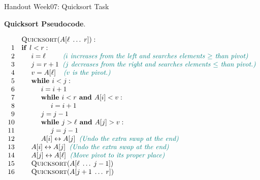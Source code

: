 \documentclass[a4paper,12pt]{article}
\begin{document}

\thispagestyle{empty}

\begin{center}
{\Large Handout Week07: Quicksort Task}\\
\end{center}

\noindent


\vspace{10pt}
{\bf Quicksort Pseudocode}. 

\[
\begin{array}{rl}
 & \text{\textsc{Quicksort}}(A[\ell\;\ldots\;r]):\\
1 & \text{\textbf{if\ }} l<r:\\
2 & \hspace{.5cm} i = \ell \;\;\;\;\;\;\;\;\; \textcolor{teal}{\text{\em ($i$ increases from the left and searches elements $\geq$ than pivot)}}\\
3 & \hspace{.5cm} j = r+1	\;\; \textcolor{teal}{\text{\em ($j$ decreases from the right and searches elements $\leq$ than pivot.)}}\\	
4 & \hspace{.5cm} v = A[\ell] \;\;\;\; \textcolor{teal}{\text{\em ($v$ is the pivot.)}}\\
5 & \hspace{.5cm} \text{\textbf{while\ }} i<j:\\
6 & \hspace{1.0cm} i = i+1\\
7 & \hspace{1.0cm} \text{\textbf{while\ }} i<r \text{\textbf{\ and\ }} A[i]<v:\\
8 & \hspace{1.5cm} i = i+1\\
9 & \hspace{1.0cm} j = j-1\\
10 & \hspace{1.0cm} \text{\textbf{while\ }} j>\ell \text{\textbf{\ and\ }} A[j]>v:\\
11 & \hspace{1.5cm} j = j-1\\
12 & \hspace{1.0cm} A[i] \leftrightarrow A[j] \;\; \textcolor{teal}{\text{\em (Undo the extra swap at the end)}}\\
13 & \hspace{0.5cm} A[i] \leftrightarrow A[j] \;\; \textcolor{teal}{\text{\em (Undo the extra swap at the end)}}\\
14 & \hspace{0.5cm} A[j] \leftrightarrow A[\ell] \;\; \textcolor{teal}{\text{\em (Move pivot to its proper place)}}\\
15 & \hspace{0.5cm} \text{\textsc{Quicksort}}(A[\ell\;\ldots\;j-1])\\
16 & \hspace{0.5cm} \text{\textsc{Quicksort}}(A[j+1\;\ldots\;r])\\
\end{array}
\]
\end{document}
